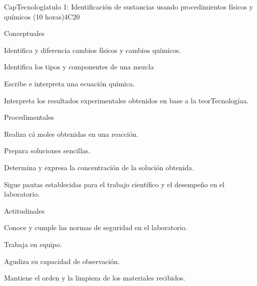 \begin{syllabus}
\begin{outcomes}
\item {}
\item {}
\end{outcomes}

\begin{competences}
    \item {}
\end{competences}

\begin{unit}{CapTecnologíatulo 1: Identificación de sustancias usando procedimientos físicos y quí­micos (10 horas)}{}{}{4}{C20}

Conceptuales

\begin{topics}
      \item Identifica y diferencia cambios físicos y cambios químicos.
      \item Identifica los tipos y componentes de una mezcla
      \item Escribe e interpreta una ecuación química.
      \item Interpreta los resultados experimentales obtenidos en base a la teorTecnologíaa.
   \end{topics}
   
   Procedimentales

\begin{topics}
      \item Realiza cá moles obtenidas en una reacción. 
      \item Prepara soluciones sencillas.
      \item Determina y expresa la concentración de la solución obtenida.
      \item Sigue pautas establecidas para el trabajo científico y el desempeño en el laboratorio.
   \end{topics}
   
   Actitudinales

\begin{topics}
      \item Conoce y cumple las normas de seguridad en el laboratorio.
      \item Trabaja en equipo.
      \item Agudiza su capacidad de observación.
      \item Mantiene el orden y la limpieza de los materiales recibidos.
   \end{topics}


\end{unit}
\end{syllabus}
